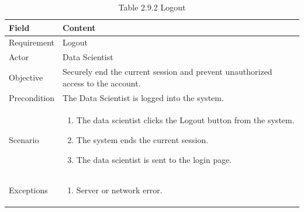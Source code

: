 \documentclass[12pt,oneside]{report}
\begin{document}
\begin{table}[H]
\centering
\caption{Table 2.9.2 Logout}
\label{tab:ds-logout}
\begin{tabularx}{\textwidth}{|p{3cm}|X|}
\hline
\textbf{Field} & \textbf{Content} \\ \hline

Requirement & Logout \\ \hline

Actor & Data Scientist \\ \hline

Objective & Securely end the current session and prevent unauthorized access to the account. \\ \hline

Precondition & The Data Scientist is logged into the system. \\ \hline

Scenario & 
\begin{minipage}[t]{0.75\textwidth}
\begin{enumerate}[leftmargin=*,label=\arabic*.]
\item The data scientist clicks the Logout button from the system.
\item The system ends the current session.
\item The data scientist is sent to the login page.
\end{enumerate}
\end{minipage} \\ \hline

Exceptions & 
\begin{minipage}[t]{0.75\textwidth}
\begin{enumerate}[leftmargin=*,label=\arabic*.]
\item Server or network error.
\end{enumerate}
\end{minipage} \\ \hline

\end{tabularx}
\end{table}
\end{document}
